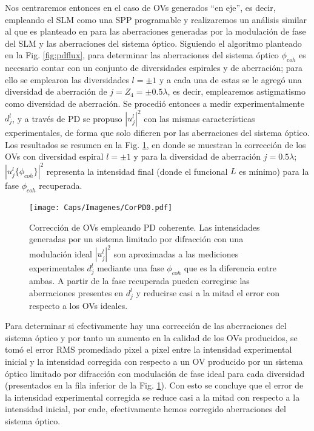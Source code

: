 Nos centraremos entonces en el caso de OVs generados ``en eje'', es decir, empleando el SLM como una SPP programable y realizaremos un análisis similar al que es planteado en \cite{EcheverriChacon2015} para las aberraciones generadas por la modulación de fase del SLM y las aberraciones del sistema óptico. Siguiendo el algoritmo planteado en la Fig. \ref{fig:pdflux}, para determinar las aberraciones del sistema óptico $\phi_{coh}$ es necesario contar con un conjunto de diversidades espirales y de aberración; para ello se emplearon las diversidades $l =\pm 1$ y a cada una de estas se le agregó una diversidad de aberración de $j= Z_4 = \pm 0.5 \lambda$, es decir, emplearemos astigmatismo como diversidad de aberración. Se procedió entonces a medir experimentalmente $d_j^l$, y a través de PD se propuso $|u_j^l|^2$ con las mismas características experimentales, de forma que solo difieren por las aberraciones del sistema óptico. Los resultados se resumen en la Fig. \ref{fig:corpd0}, en donde se muestran la corrección de los OVs con diversidad espiral $l=\pm 1$ y para la diversidad de aberración $j=0.5 \lambda$; $|u_j^l \{\phi_{coh}\}|^2$ representa la intensidad final (donde el funcional $L$ es mínimo) para la fase $\phi_{coh}$ recuperada.\\


\begin{figure}[!ht]
  \centering
    \texttt{[image: Caps/Imagenes/CorPD0.pdf]}
  \caption[Corrección de OVs empleando PD coherente.]{Corrección de OVs empleando PD coherente. Las intensidades generadas por un sistema limitado por difracción con una modulación ideal $|u_j^l|^2$ son aproximadas a las mediciones experimentales $d_j^l$ mediante una fase $\phi_{coh}$ que es la diferencia entre ambas. A partir de la fase recuperada pueden corregirse las aberraciones presentes en $d_j^l$ y reducirse casi a la mitad el error con respecto a los OVs ideales.}
  \label{fig:corpd0}
\end{figure}

Para determinar si efectivamente hay una corrección de las aberraciones del sistema óptico y por tanto un aumento en la calidad de los OVs producidos, se tomó el error RMS promediado pixel a pixel entre la intensidad experimental inicial y la intensidad corregida con respecto a un OV producido por un sistema óptico limitado por difracción con modulación de fase ideal para cada diversidad (presentados en la fila inferior de la Fig. \ref{fig:corpd0}). Con esto se concluye que el error de la intensidad experimental corregida se reduce casi a la mitad con respecto a la intensidad inicial, por ende, efectivamente hemos corregido aberraciones del sistema óptico.\\

